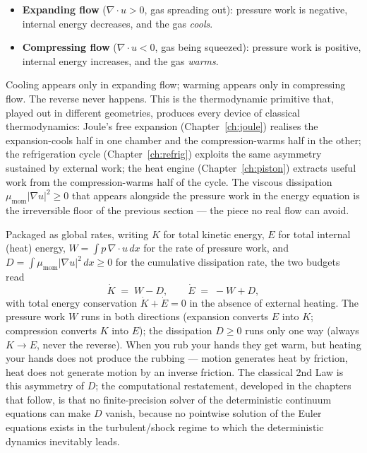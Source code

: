 \begin{itemize}
\item \textbf{Expanding flow} ($\nabla\!\cdot u > 0$, gas spreading
out): pressure work is negative, internal energy decreases, and the
gas \emph{cools}.
\item \textbf{Compressing flow} ($\nabla\!\cdot u < 0$, gas being
squeezed): pressure work is positive, internal energy increases, and
the gas \emph{warms}.
\end{itemize}

Cooling appears only in expanding flow; warming appears only in
compressing flow. The reverse never happens. This is the
thermodynamic primitive that, played out in different geometries,
produces every device of classical thermodynamics: Joule's free
expansion (Chapter~\ref{ch:joule}) realises the expansion-cools half
in one chamber and the compression-warms half in the other; the
refrigeration cycle (Chapter~\ref{ch:refrig}) exploits the same
asymmetry sustained by external work; the heat engine
(Chapter~\ref{ch:piston}) extracts useful work from the
compression-warms half of the cycle. The viscous dissipation
$\mu_{\mathrm{mom}}|\nabla u|^2 \geq 0$ that appears alongside the
pressure work in the energy equation is the irreversible floor of the
previous section --- the piece no real flow can avoid.

Packaged as global rates, writing $K$ for total kinetic energy, $E$
for total internal (heat) energy, $W = \int p\,\nabla\!\cdot u\,dx$
for the rate of pressure work, and $D = \int
\mu_{\mathrm{mom}}|\nabla u|^2\,dx \geq 0$ for the cumulative
dissipation rate, the two budgets read
\begin{equation}\label{eq:2nd_law_compact}
  \dot K \;=\; W - D, \qquad \dot E \;=\; -W + D,
\end{equation}
with total energy conservation $\dot K + \dot E = 0$ in the absence
of external heating. The pressure work $W$ runs in both directions
(expansion converts $E$ into $K$; compression converts $K$ into $E$);
the dissipation $D \geq 0$ runs only one way (always $K \to E$, never
the reverse). When you rub your hands they get warm, but heating your
hands does not produce the rubbing --- motion generates heat by
friction, heat does not generate motion by an inverse friction. The
classical 2nd Law is this asymmetry of $D$; the computational
restatement, developed in the chapters that follow, is that no
finite-precision solver of the deterministic continuum equations can
make $D$ vanish, because no pointwise solution of the Euler equations
exists in the turbulent/shock regime to which the deterministic
dynamics inevitably leads.

